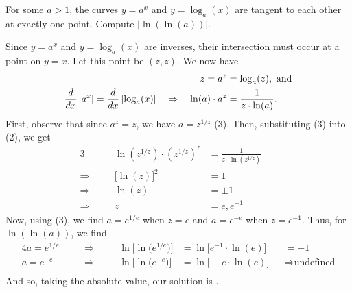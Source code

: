 \begin{problem}
     For some $a > 1$, the curves $y = a^x$ and $y = \log_a(x)$ are tangent to each other at exactly one point. Compute $| \ln(\ln(a))|$.
\end{problem}

\begin{solution}[1]
    Since $y=a^x$ and $y=\log_a(x)$ are inverses, their intersection must occur at a point on $y=x$. Let this point be $(z,z)$. We now have
    \begin{align}\setcounter{equation}{0}
        z=a^z &=\log_a(z),\ \text{and}\\
        \frac{d}{dx}\left[a^x\right] = \frac{d}{dx}\left[\log_a(x)\right] \quad \Rightarrow \quad \ln(a)\cdot a^z &= \frac{1}{z\cdot \ln(a)}.
    \end{align}
    First, observe that since $a^z=z$, we have $a=z^{1/z}$ (3). Then, substituting (3) into (2), we get
    \begin{alignat*}{3}
        && \quad \ln\!\left(z^{1/z}\right)\cdot \left(z^{1/z}\right)^z &{}= \frac{1}{z\cdot \ln\!\left(z^{1/z}\right)} & & \\
        \Rightarrow && \quad \big[\ln(z)\big]^2 &{}= 1 & & \\
        \Rightarrow && \quad \ln(z) &{}= \pm1 & & \\
        \Rightarrow && \quad z &{}= e,e^{-1} & &
    \end{alignat*}
    Now, using (3), we find $a=e^{1/e}$ when $z=e$ and $a = e^{-e}$ when $z=e^{-1}$. Thus, for $\ln(\ln(a))$, we find
    \begin{alignat*}{4}
        a=e^{1/e} && \quad \Rightarrow \quad && \ln\!\big[\ln\!\big(e^{1/e}\big)\big] &{}= \ln\!\big[e^{-1}\cdot\ln(e)] &&{}= -1\\
        a=e^{-e} && \quad \Rightarrow \quad && \ln\!\big[\ln\!\big(e^{-e}\big)\big] &{}= \ln\!\big[-e\cdot\ln(e)\big] &&{}\Rightarrow \text{undefined}\\
    \end{alignat*}
    And so, taking the absolute value, our solution is .
\end{solution}

\newpageSol

